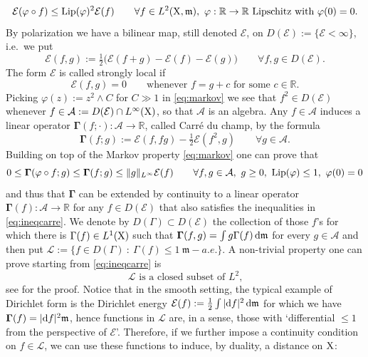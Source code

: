 \documentclass[11pt]{article}
\numberwithin{equation}{section}
\newcommand{\R}{\mathbb{R}}
\newcommand{\X}{{\rm X}}
\newcommand{\mm}{{\mathfrak m}}
\renewcommand{\d}{{\rm d}}
\newcommand{\Lip}{{\rm Lip}}
\newcommand{\Ggamma}{{\mathbf \Gamma}}
\begin{document}
\begin{equation}
\label{eq:markov}
\mathcal E(\varphi\circ f)\leq \Lip(\varphi)^2\mathcal E(f)\qquad\forall f\in L^2(\X,\mm),\ \varphi:\R\to\R\ \text{Lipschitz with }\varphi(0)=0.
\end{equation}
By polarization we have a bilinear map, still denoted  $\mathcal E$, on $D(\mathcal E):=\{\mathcal E<\infty\}$, i.e.\ we put
\[
\mathcal E(f,g):=\tfrac12\big(\mathcal E(f+g)-\mathcal E(f)-\mathcal E(g)\big)\qquad\forall f,g\in D(\mathcal E).
\]
The form $\mathcal E$ is called strongly local if
\[
\mathcal E(f,g)=0\qquad\text{whenever $f=g+c$ for some $c\in\R$}.
\]
Picking $\varphi(z):=z^2\wedge C$ for $C\gg1$ in  \eqref{eq:markov} we see that $f^2\in D(\mathcal E)$ whenever $f\in \mathcal A:=D(\mathcal E)\cap L^\infty(\X)$, so that $\mathcal A$ is an algebra. Any $f\in \mathcal A$ induces a linear operator  $\Ggamma(f;\cdot): \mathcal A\to\R$, called Carr\'e du champ, by the formula
\[
\Ggamma(f;g):=\mathcal E(f,fg)-\tfrac12\mathcal E(f^2,g)\qquad\forall g\in \mathcal A.
\]
Building on top of the Markov property \eqref{eq:markov} one can prove that 
\begin{equation}
\label{eq:ineqcarre}
0\leq \Ggamma(\varphi\circ f;g)\leq \Ggamma(f;g)\leq \|g\|_{L^\infty}\mathcal E(f)\qquad\forall f,g\in\mathcal A,\ g\geq0,\ \Lip(\varphi)\leq 1,\ \varphi(0)=0%
\end{equation}
and thus that $\Ggamma$ can be extended by continuity to a linear operator $\Ggamma(f):\mathcal A\to\R$ for any $f\in D(\mathcal E)$ that also satisfies  the inequalities in \eqref{eq:ineqcarre}. We denote by $D(\Gamma)\subset D(\mathcal E)$ the collection of those $f$'s for which there is $\Gamma(f)\in L^1(\X)$ such that $\Ggamma(f,g)=\int g\Gamma(f)\,\d\mm$ for every $g\in\mathcal A$ and then put   $\mathcal L:=\{f\in D(\Gamma) \ :\ \Gamma(f)\leq 1\ \mm-a.e.\}$. A non-trivial property one can prove starting from \eqref{eq:ineqcarre} is 
\begin{equation}
\label{eq:Lclosed}
\mathcal L\text{ is a closed subset of $L^2$,}
\end{equation}
see \cite[Chapter 1]{BH91}  for the proof.  Notice that in the smooth setting, the typical example of Dirichlet form is the Dirichlet energy $\mathcal E(f):=\frac12\int|\d f|^2\,\d\mm$ for which we have $\Ggamma(f)=|\d f|^2\mm$, hence functions in $\mathcal L$ are, in a sense, those with `differential $\leq 1$ from the perspective of $\mathcal E$'. Therefore, if we further impose a continuity condition on $f\in\mathcal L$, we can use these functions to induce, by duality, a distance on $\X$:
\end{document}
